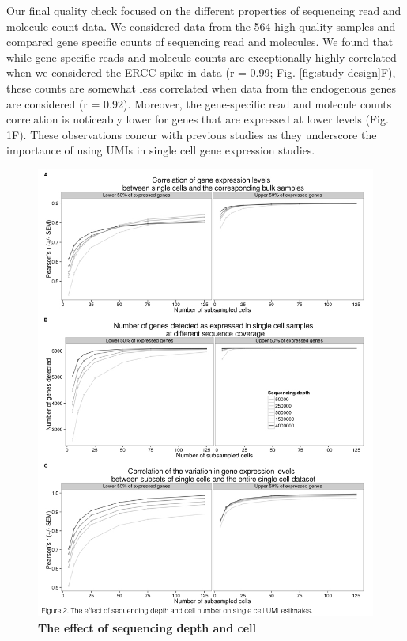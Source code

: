 Our final quality check focused on the different properties of
sequencing read and molecule count data. We considered data from the 564
high quality samples and compared gene specific counts of sequencing
read and molecules. We found that while gene-specific reads and molecule
counts are exceptionally highly correlated when we considered the ERCC
spike-in data (r = 0.99; Fig. \ref{fig:study-design}F), these counts are somewhat less
correlated when data from the endogenous genes are considered (r =
0.92). Moreover, the gene-specific read and molecule counts correlation
is noticeably lower for genes that are expressed at lower levels (Fig.
1F). These observations concur with previous studies \citep{Islam2014,
Grun2014} as they underscore the importance of using UMIs in single
cell gene expression studies.

\begin{figure}[htbp]
\centering
\includegraphics[trim=0 .3in 0 0,clip,width=5in]{img/ch04/Figure02.jpeg}
\caption[The effect of sequencing depth and cell
number on single cell UMI estimates.]{\textbf{The effect of sequencing depth and cell
}}
\end{figure}
